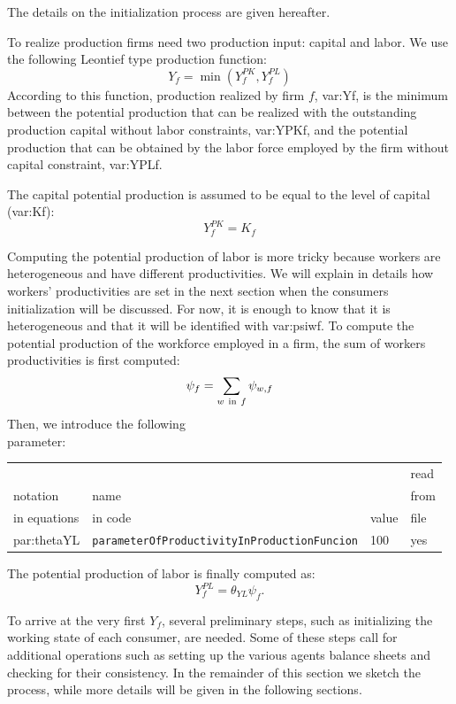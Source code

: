 \documentclass{book}
\begin{document}
The details on the initialization process are given hereafter.

\label{pg:inputs1}
To realize production firms need two production input: capital and labor. We use the following Leontief type production function:
\begin{equation}
Y_f=\min(Y_f^{PK},Y_f^{PL})
	\label{eq:production_function}
\end{equation}
According to this function, production realized by firm $f$, \gls{var:Yf}, is the minimum between the potential production that can be realized with the outstanding production capital without labor constraints, \gls{var:YPKf}, and the potential production that can be obtained by the labor force employed by the firm without capital constraint, \gls{var:YPLf}. 


The capital potential production is assumed to be equal to the level of capital (\gls{var:Kf}):
\[
	Y^{PK}_f=K_f
\]

Computing the potential production of labor is more tricky because workers are heterogeneous and have different productivities. 
We will explain in details how workers' productivities are set in the next section when the consumers initialization will be discussed. For now, it is enough to know that it is heterogeneous and that it will be identified with \gls{var:psiwf}.  To compute the potential production of the workforce employed in a firm, the sum of workers productivities is first computed:
\[
	\psi_f=\sum_{w \ \textnormal{in} \ f}\psi_{w,f}
\]
Then, we introduce the following\\ 
parameter:\\
\begin{tabular}{l l l l}
	\hline
	& &&read\\
	notation& name &&from\\
	in equations& in code&value&file\\
	\hline
	\hline
	\gls{par:thetaYL}&\verb+parameterOfProductivityInProductionFuncion+&100&yes\\
	\hline
\end{tabular}

\vskip5mm

The potential production of labor is finally computed as:
\[
	Y^{PL}_f=\theta_{YL}\psi_f.
\]




To arrive at the very first $Y_f$,  several preliminary steps, such as initializing the working state of each consumer, are needed. Some of these steps call for additional operations such as setting up the various agents balance sheets and checking for their consistency.
In the remainder of this section we sketch the process, while more details will be given in the following sections.
\end{document}
